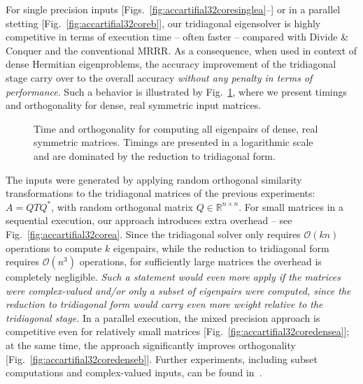 \documentclass[final]{siamltex}
\newcommand{\R}{\mathbb{R}}
\newcommand{\Rnn}{\R^{n \times n}}
\newcommand\order[1]{\mathcal{O}(#1)}
\begin{document}
For single precision inputs [Figs.~\ref{fig:accartifial32coresinglea}--]
or in a parallel stetting [Fig.~\ref{fig:accartifial32coreb}], our tridiagonal
eigensolver is highly competitive in terms of execution time --
often faster -- compared with Divide \& Conquer and the
conventional MRRR. As a consequence, when used in context of dense Hermitian
eigenproblems, the accuracy improvement of the tridiagonal stage carry over to the
overall accuracy {\it without any penalty in terms of performance}. Such a
behavior is illustrated by
Fig.~\ref{fig:accartifial32coredense}, where we present timings and orthogonality
for dense, real symmetric input matrices. 
\begin{figure}[tbh]
   \centering   
    
   \caption{
     Time and orthogonality for computing all eigenpairs of dense, real
     symmetric matrices. Timings are presented in a
     logarithmic scale and are dominated by the reduction to tridiagonal
     form.    
   }
   \label{fig:accartifial32coredense}
\end{figure}
The inputs were generated by applying random orthogonal similarity
transformations to the tridiagonal matrices of the previous experiments:
$A = QTQ^*$, with random orthogonal matrix $Q \in \Rnn$. 
For small matrices in a sequential execution, our approach
introduces extra overhead -- see Fig.~\ref{fig:accartifial32corea}. Since 
the tridiagonal solver only requires $\order{kn}$ operations to compute $k$
eigenpairs, while the reduction to tridiagonal form requires
$\order{n^3}$ operations, for sufficiently large matrices the overhead is
completely negligible. {\em Such a statement would even more apply if the matrices were
complex-valued and/or only a subset of eigenpairs were computed, since the
reduction to tridiagonal form would carry even more
weight relative to the tridiagonal stage.} 
In a parallel execution, the mixed precision approach is competitive even
for relatively small matrices [Fig.~\ref{fig:accartifial32coredensea}]; at
the same time, the approach significantly 
improves orthogonality [Fig.~\ref{fig:accartifial32coredenseb}]. Further
experiments, including  
subset computations and complex-valued inputs, can be found in~\cite{mydiss,mixedtr}.  
\end{document}
